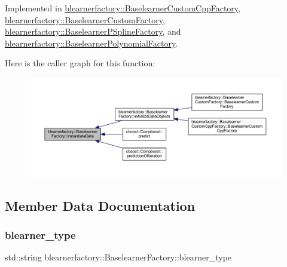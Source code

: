 Implemented in \mbox{\hyperlink{classblearnerfactory_1_1_baselearner_custom_cpp_factory_a1e7c75381ec018b38efa021ba4dd475f}{blearnerfactory\+::\+Baselearner\+Custom\+Cpp\+Factory}}, \mbox{\hyperlink{classblearnerfactory_1_1_baselearner_custom_factory_ac37e7305a627f98729d266b54cf8fa1c}{blearnerfactory\+::\+Baselearner\+Custom\+Factory}}, \mbox{\hyperlink{classblearnerfactory_1_1_baselearner_p_spline_factory_a8e9f7977906b310d21dda5cceb15c0d8}{blearnerfactory\+::\+Baselearner\+P\+Spline\+Factory}}, and \mbox{\hyperlink{classblearnerfactory_1_1_baselearner_polynomial_factory_ae8a2c70c75eb37e6c782d1bb17627272}{blearnerfactory\+::\+Baselearner\+Polynomial\+Factory}}.

Here is the caller graph for this function\+:\nopagebreak
\begin{figure}[H]
\begin{center}
\leavevmode
\includegraphics[width=350pt]{classblearnerfactory_1_1_baselearner_factory_ac4a38c4815fb33b8d4785745117c5e57_icgraph}
\end{center}
\end{figure}


\subsection{Member Data Documentation}
\mbox{\label{classblearnerfactory_1_1_baselearner_factory_a3382b7d9833484f63755a26447a5d2e4}} 
\subsubsection{\texorpdfstring{blearner\+\_\+type}{blearner\_type}}
{\footnotesize\ttfamily std\+::string blearnerfactory\+::\+Baselearner\+Factory\+::blearner\+\_\+type\hspace{0.3cm}{\ttfamily [protected]}}

